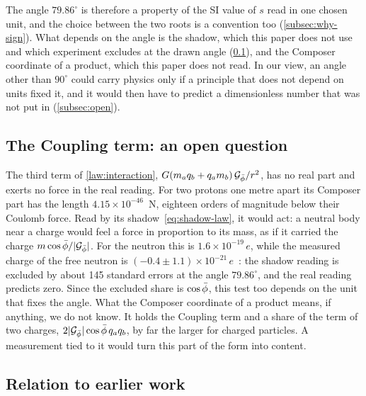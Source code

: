 The angle $79.86^\circ$ is therefore a property of the SI value of $s$ read in one chosen unit, and the choice between the two roots is a convention too (\cref{subsec:why-sign}). What depends on the angle is the shadow, which this paper does not use and which experiment excludes at the drawn angle (\cref{subsec:coupling}), and the Composer coordinate of a product, which this paper does not read. In our view, an angle other than $90^\circ$ could carry physics only if a principle that does not depend on units fixed it, and it would then have to predict a dimensionless number that was not put in (\cref{subsec:open}).

\subsection{The Coupling term: an open question}\label{subsec:coupling}

The third term of \cref{law:interaction}, $G(m_a q_b + q_a m_b)\,\mathcal{G}_{\bar{\phi}}/r^2$, has no real part and exerts no force in the real reading. For two protons one metre apart its Composer part has the length $4.15 \times 10^{-46}$~N, eighteen orders of magnitude below their Coulomb force. Read by its shadow~\cref{eq:shadow-law}, it would act: a neutral body near a charge would feel a force in proportion to its mass, as if it carried the charge $m\cos\bar{\phi}/\lvert\mathcal{G}_{\bar{\phi}}\rvert$. For the neutron this is $1.6 \times 10^{-19}\,e$, while the measured charge of the free neutron is $(-0.4 \pm 1.1) \times 10^{-21}\,e$~\citep{Baumann1988}: the shadow reading is excluded by about 145 standard errors at the angle $79.86^\circ$, and the real reading predicts zero. Since the excluded share is $\cos\bar{\phi}$, this test too depends on the unit that fixes the angle. What the Composer coordinate of a product means, if anything, we do not know. It holds the Coupling term and a share of the term of two charges, $2\lvert\mathcal{G}_{\bar{\phi}}\rvert\cos\bar{\phi}\,q_a q_b$, by far the larger for charged particles. A measurement tied to it would turn this part of the form into content.

\subsection{Relation to earlier work}\label{subsec:earlier}

